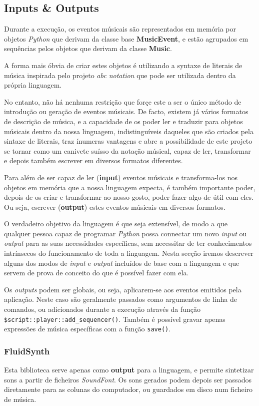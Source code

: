 \subsection{Inputs \& Outputs}
Durante a execução, os eventos músicais são representados em memória por objetos \textit{Python} que derivam da classe base \textbf{MusicEvent}, e estão agrupados em sequências pelos objetos que derivam da classe \textbf{Music}.

A forma mais óbvia de criar estes objetos é utilizando a syntaxe de literais de música inspirada pelo projeto \textit{abc notation} que pode ser utilizada dentro da própria linguagem.

No entanto, não há nenhuma restrição que forçe este a ser o único método de introdução ou geração de eventos músicais. De facto, existem já vários formatos de descrição de música, e a capacidade de os poder ler e traduzir para objetos músicais dentro da nossa linguagem, indistinguíveis daqueles que são criados pela sintaxe de literais, traz ínumeras vantagens e abre a possibilidade de este projeto se tornar como um canivete suísso da notação músical, capaz de ler, transformar e depois também escrever em diversos formatos diferentes.

Para além de ser capaz de ler (\textbf{input}) eventos músicais e transforma-los nos objetos em memória que a nossa linguagem expecta, é também importante poder, depois de os criar e transformar ao nosso gosto, poder fazer algo de útil com eles. Ou seja, escrever (\textbf{output}) estes eventos músicais em diversos formatos.

O verdadeiro objetivo da linguagem é que seja extensível, de modo a que qualquer pessoa capaz de programar \textit{Python} possa connectar um novo \textit{input} ou \textit{output} para as suas necessidades específicas, sem necessitar de ter conhecimentos intrínsecos do funcionamento de toda a linguagem. Nesta secção iremos descrever alguns dos modos de \textit{input} e \textit{output} incluídos de base com a linguagem e que servem de prova de conceito do que é possível fazer com ela.

Os \textit{outputs} podem ser globais, ou seja, aplicarem-se aos eventos emitidos pela aplicação. Neste caso são geralmente passados como argumentos de linha de comandos, ou adicionados durante a execução através da função \texttt{\$script::player::add\_sequencer()}. Também é possível gravar apenas expressões de música específicas com a função \texttt{save()}.
\subsubsection{FluidSynth}
Esta biblioteca serve apenas como \textbf{output} para a linguagem, e permite sintetizar sons a partir de ficheiros \textit{SoundFont}. Os sons gerados podem depois ser passados diretamente para as colunas do computador, ou guardados em disco num ficheiro de música.

